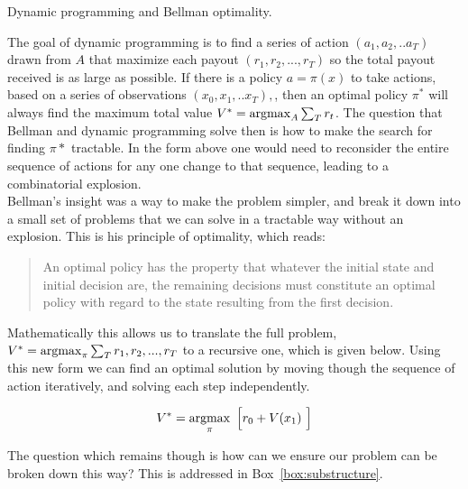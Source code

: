 \begin{featurebox}
	\caption{Dynamic programming and Bellman optimality.}
	\label{box:bellman}
	The goal of dynamic programming is to find a series of action $(a_1, a_2, ..a_T)$ drawn from $A$ that maximize each payout $(r_1, r_2, ..., r_{T})$ so the total payout received is as large as possible. If there is a policy $a = \pi(x)$ to take actions, based on a series of observations $(x_0, x_1, ..x_{T}),$, then an optimal policy $\pi^*$ will always find the maximum total value $V^* = \operatorname*{argmax}_{A} \sum_T r_t $. The question that Bellman and dynamic programming solve then is how to make the search for finding $\pi*$ tractable. In the form above one would need to reconsider the entire sequence of actions for any one change to that sequence, leading to a combinatorial explosion. 
	\\
	Bellman's insight was a way to make the problem simpler, and break it down into a small set of problems that we can solve in a tractable way without an explosion. This is his principle of optimality, which reads:

	\begin{quote}
		An optimal policy has the property that whatever the initial state and initial decision are, the remaining decisions must constitute an optimal policy with regard to the state resulting from the first decision. \cite{needed}
	\end{quote}

	Mathematically this allows us to translate the full problem, $V^* = \operatorname*{argmax}_{\pi} \sum_T r_1, r_2, ..., r_{T}$ to a recursive one, which is given below. Using this new form we can find an optimal solution by moving though the sequence of action iteratively, and solving each step independently.

	\begin{equation}
		V^* = \operatorname*{argmax}_{\pi} \ \Big [ r_0 + V(x_1) \ \Big ]
	\end{equation}
	
	The question which remains though is how can we ensure our problem can be broken down this way? This is addressed in Box~\ref{box:substructure}.
	\medskip
\end{featurebox}

